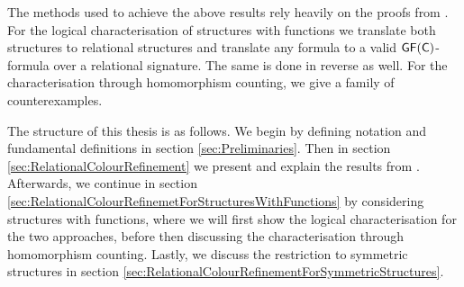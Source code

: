 The methods used to achieve the above results rely heavily on the proofs from \cite{scheidt2025ColorRefinement}.
For the logical characterisation of structures with functions we translate both structures to relational structures and translate any formula to a valid $\mathsf{GF}(\mathsf{C})$-formula over a relational signature.
The same is done in reverse as well.
For the characterisation through homomorphism counting, we give a family of counterexamples.

The structure of this thesis is as follows.
We begin by defining notation and fundamental definitions in section \ref{sec:Preliminaries}.
Then in section \ref{sec:RelationalColourRefinement} we present and explain the results from \cite{scheidt2025ColorRefinement}.
Afterwards, we continue in section \ref{sec:RelationalColourRefinemetForStructuresWithFunctions} by considering structures with functions, where we will first show the logical characterisation for the two approaches, before then discussing the characterisation through homomorphism counting.
Lastly, we discuss the restriction to symmetric structures in section \ref{sec:RelationalColourRefinementForSymmetricStructures}.




